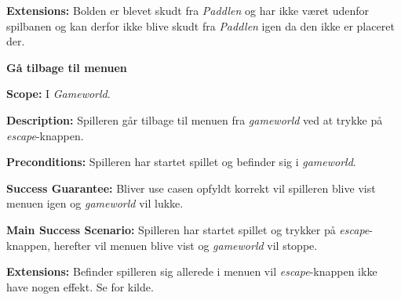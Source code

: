 \textbf{Extensions:}\newline
Bolden er blevet skudt fra \textit{Paddlen} og har ikke været udenfor spilbanen og kan derfor ikke blive skudt fra \textit{Paddlen} igen da den ikke er placeret der.\newline \newline


\textbf{Gå tilbage til menuen}\newline

\textbf{Scope:}\newline
I \textit{Gameworld}.\newline

\textbf{Description:} \newline
Spilleren går tilbage til menuen fra \textit{gameworld} ved at trykke på \textit{escape}-knappen.\newline

\textbf{Preconditions:}\newline
Spilleren har startet spillet og befinder sig i \textit{gameworld}.\newline

\textbf{Success Guarantee:}\newline
Bliver use casen opfyldt korrekt vil spilleren blive vist menuen igen og \textit{gameworld} vil lukke.\newline

\textbf{Main Success Scenario:}\newline
Spilleren har startet spillet og trykker på \textit{escape}-knappen, herefter vil menuen blive vist og \textit{gameworld} vil stoppe. \newline

\textbf{Extensions:}\newline
Befinder spilleren sig allerede i menuen vil \textit{escape}-knappen ikke have nogen effekt.\newline
\newline
Se \cite[chap. 6.1]{Mathiassen200006} for kilde.